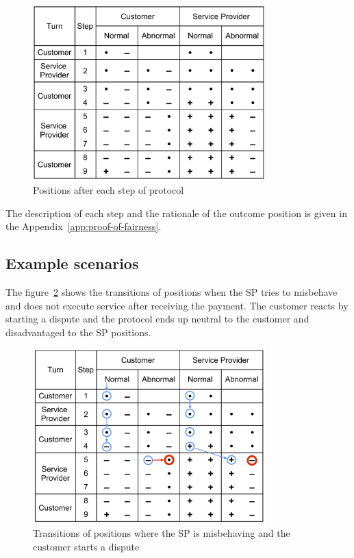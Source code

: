\documentclass{ieeeaccess}
\begin{document}
\begin{figure}[h!]
\includegraphics[width=9cm]{formal-table-of-positions.png}
\centering
\caption{Positions after each step of protocol}
\label{fig:positions}
\end{figure}

The description of each step and the rationale of the outcome position is given in the Appendix~\ref{app:proof-of-fairness}.

\subsection{Example scenarios}\label{example-scenarios}

The figure~\ref{fig:misbehaviour} shows the transitions of positions when the SP tries to misbehave and does not execute service after receiving the payment. The customer reacts by starting a dispute and the protocol ends up neutral to the customer and disadvantaged to the SP positions.

\begin{figure}[h!]
\includegraphics[width=9cm]{formal-misbehaviour-path.png}
\centering
\caption{Transitions of positions where the SP is misbehaving and the customer starts a dispute}
\label{fig:misbehaviour}
\end{figure}
\end{document}

